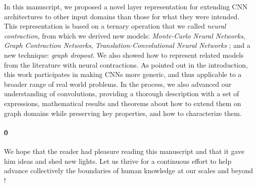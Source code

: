 
In this manuscript, we proposed a novel layer representation for extending CNN architectures to other input domains than those for what they were intended. This representation is based on a ternary operation that we called \emph{neural contraction}, from which we derived new models: \emph{Monte-Carlo Neural Networks}, \emph{Graph Contraction Networks}, \emph{Translation-Convolutional Neural Networks} ; and a new technique: \emph{graph dropout}. We also showed how to represent related models from the literature with neural contractions. As pointed out in the introduction, this work participates in making CNNs more generic, and thus applicable to a broader range of real world problems. In the process, we also advanced our understanding of convolutions, providing a thorough description with a set of expressions, mathematical results and theorems about how to extend them on graph domains while preserving key properties, and how to characterize them.


\paragraph{\h{0}}
We hope that the reader had pleasure reading this manuscript and that it gave him ideas and shed new lights. Let us thrive for a continuous effort to help advance collectively the boundaries of human knowledge at our scales and beyond !